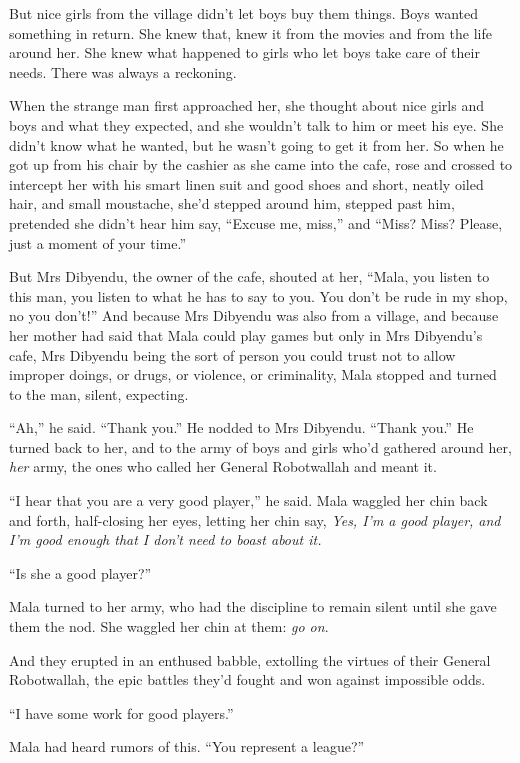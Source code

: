 But nice girls from the village didn't let boys buy them things.
Boys wanted something in return. She knew that, knew it from the
movies and from the life around her. She knew what happened to
girls who let boys take care of their needs. There was always a
reckoning.

When the strange man first approached her, she thought about nice
girls and boys and what they expected, and she wouldn't talk to him
or meet his eye. She didn't know what he wanted, but he wasn't
going to get it from her. So when he got up from his chair by the
cashier as she came into the cafe, rose and crossed to intercept
her with his smart linen suit and good shoes and short, neatly
oiled hair, and small moustache, she'd stepped around him, stepped
past him, pretended she didn't hear him say, ``Excuse me, miss,'' and
``Miss? Miss? Please, just a moment of your time.''

But Mrs Dibyendu, the owner of the cafe, shouted at her, ``Mala, you
listen to this man, you listen to what he has to say to you. You
don't be rude in my shop, no you don't!'' And because Mrs Dibyendu
was also from a village, and because her mother had said that Mala
could play games but only in Mrs Dibyendu's cafe, Mrs Dibyendu
being the sort of person you could trust not to allow improper
doings, or drugs, or violence, or criminality, Mala stopped and
turned to the man, silent, expecting.

``Ah,'' he said. ``Thank you.'' He nodded to Mrs Dibyendu. ``Thank you.''
He turned back to her, and to the army of boys and girls who'd
gathered around her, \emph{her} army, the ones who called her
General Robotwallah and meant it.

``I hear that you are a very good player,'' he said. Mala waggled her
chin back and forth, half-closing her eyes, letting her chin say,
\emph{Yes, I'm a good player, and I'm good enough that I don't need to boast about it.}

``Is she a good player?''

Mala turned to her army, who had the discipline to remain silent
until she gave them the nod. She waggled her chin at them:
\emph{go on}.

And they erupted in an enthused babble, extolling the virtues of
their General Robotwallah, the epic battles they'd fought and won
against impossible odds.

``I have some work for good players.''

Mala had heard rumors of this. ``You represent a league?''

